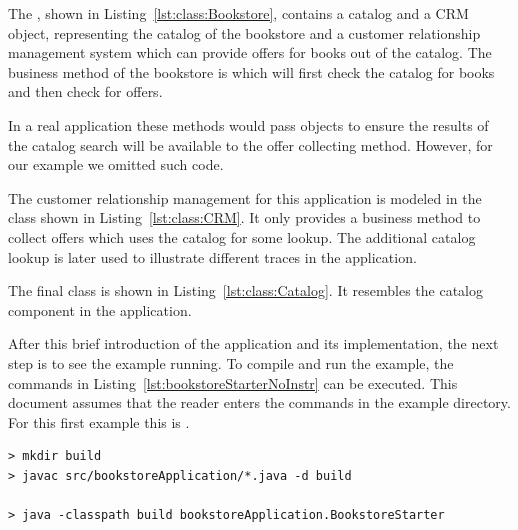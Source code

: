 \noindent The , shown in Listing~\ref{lst:class:Bookstore}, contains a catalog and a CRM object, representing the catalog of the bookstore and a customer relationship management system which can provide offers for books out of the catalog. The business method of the bookstore is  which will first check the catalog for books and then check for offers.

In a real application these methods would pass objects to ensure the results of the catalog search will be available to the offer collecting method. However, for our example we omitted such code. 



\noindent The customer relationship management for this application is modeled in the  class shown in Listing~\ref{lst:class:CRM}. It only provides a business method to collect offers which uses the catalog for some lookup. The additional catalog lookup is later used to illustrate different traces in the application.



\pagebreak

\noindent The final class is  shown in Listing~\ref{lst:class:Catalog}. It resembles the catalog component in the application.



\noindent After this brief introduction of the application and its implementation, the next step is to see the example running. To compile and run the example, the commands in Listing~\ref{lst:bookstoreStarterNoInstr} can be executed. This document assumes that the reader enters the commands in the example directory. For this first example this is .
\\

\setBashListing
% 
\begin{lstlisting}[label=lst:bookstoreStarterNoInstr, caption=Commands to compile and run the Bookstore application]
> mkdir build
> javac src/bookstoreApplication/*.java -d build

> java -classpath build bookstoreApplication.BookstoreStarter 
\end{lstlisting}

